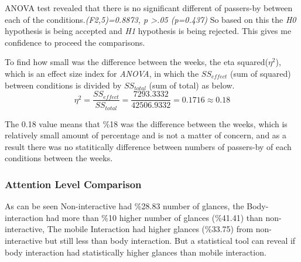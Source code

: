 \begin{table}[H]
\caption{Number of passers-by in three weeks}
\label{tab:passerbyofthreeweeks}
\centering
{}
\end{table}

ANOVA test revealed that there is no significant different of passers-by between each of the conditions.\emph{(F2,5)=0.8873, p >.05 (p=0.437)}
So based on this the \emph{H0} hypothesis is being accepted and \emph{H1} hypothesis is being rejected. This gives me confidence to proceed the comparisons.

To find how small was the difference between the weeks, the eta squared(${\eta}^2$), which is an effect size index for \emph{ANOVA}, in which the $SS_{effect}$ (sum of squared) between conditions is divided by $SS_{total}$  (sum of total) as below.
\[
{\eta}^2 = \frac{{SS}_{effect}}{{SS}_{total}} = \frac{7293.3332}{42506.9332} = 0.1716\approx 0.18
\]

The 0.18 value means that \%18 was the difference between the weeks, which is relatively small amount of percentage and is not a matter of concern, and as a result there was no statitically difference between numbers of passers-by of each conditions between the weeks.




\subsubsection {Attention Level Comparison}
As can be seen Non-interactive had \%28.83 number of glances, the Body-interaction had more than \%10 higher number of glances (\%41.41) than non-interactive, The mobile Interaction had higher glances (\%33.75) from non-interactive but still less than body interaction.  But a statistical tool can reveal if body interaction had statistically higher glances than mobile interaction.

